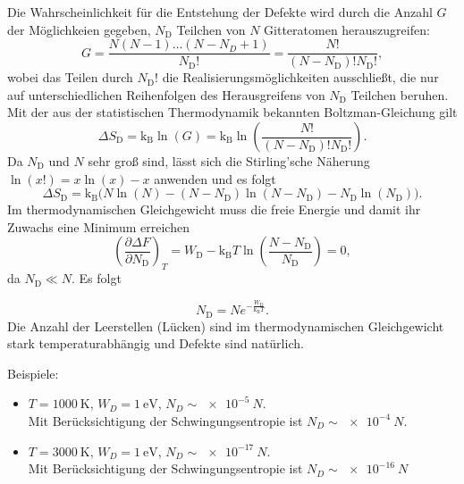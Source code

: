 	Die Wahrscheinlichkeit für die Entstehung der Defekte wird durch die Anzahl $G$ der Möglichkeien gegeben, $N_\mathrm{D}$ Teilchen von $N$ Gitteratomen herauszugreifen:
	\begin{equation}
		\label{eq:II.4.2}
		G = \frac{N\left( N-1 \right) \ldots \left( N-N_{D}+1 \right) }{N_\mathrm{D} !} 
		= \frac{N!}{\left( N-N_\mathrm{D} \right) ! N_\mathrm{D} !},
	\end{equation}
	wobei das Teilen durch $N_\mathrm{D}!$ die Realisierungsmöglichkeiten ausschließt, die nur auf unterschiedlichen Reihenfolgen des Herausgreifens von $N_\mathrm{D}$ Teilchen beruhen.\\
	Mit der aus der statistischen Thermodynamik bekannten Boltzman-Gleichung gilt
	$$
	\Delta S_\mathrm{D} = \mathrm{k}_{\mathrm{B}} \ln\left( G \right) = \mathrm{k}_{\mathrm{B}} \ln\left( \frac{N!}{\left( N-N_\mathrm{D} \right) ! N_\mathrm{D} !} \right).
	$$ 
	Da $N_\mathrm{D}$ und $N$ sehr groß sind, lässt sich die Stirling'sche Näherung ${\ln\left( x! \right) = x\ln(x) - x}$ anwenden und es folgt
	$$
	\Delta S_\mathrm{D} = \mathrm{k}_{\mathrm{B}} \Big( N \ln\left( N \right)  - \left( N-N_\mathrm{D} \right) \ln\left( N-N_\mathrm{D} \right) - N_\mathrm{D} \ln\left( N_\mathrm{D} \right)  \Big) .
	$$ 
	Im thermodynamischen Gleichgewicht muss die freie Energie und damit ihr Zuwachs eine Minimum erreichen
	$$
	\left( \frac{\partial \Delta F}{\partial N_\mathrm{D}}  \right) _{T} = W_\mathrm{D} - \mathrm{k}_{\mathrm{B}} T \ln\left( \frac{N -N_\mathrm{D}}{N_\mathrm{D}} \right) = 0,
	$$ 
	da $N_\mathrm{D} \ll N$. Es folgt
	\setcounter{equation}{3}
	\begin{important}
		\begin{equation}
			\label{eq:II.4.3}
			N_\mathrm{D} = N e^{- \frac{W_\mathrm{D}}{\mathrm{k}_{\mathrm{B}} T}}.
		\end{equation}
		Die Anzahl der Leerstellen (Lücken) sind im thermodynamischen Gleichgewicht stark temperaturabhängig und Defekte sind natürlich.
	\end{important}
	Beispiele:
	\begin{itemize}
		\item $T = \SI{1000}{\kelvin}$, $W_{D} = \SI{1}{\electronvolt}$, $N_{D}\sim \SI{e-5}{N}$. \\
			Mit Berücksichtigung der Schwingungsentropie ist $N_{D}\sim \SI{e-4}{N}$.
		\item $T = \SI{3000}{\kelvin}$, $W_{D} = \SI{1}{\electronvolt}$, $N_{D}\sim \SI{e-17}{N}$. \\
			Mit Berücksichtigung der Schwingungsentropie ist $N_{D}\sim \SI{e-16}{N}$
	\end{itemize}

